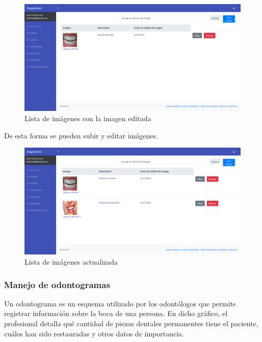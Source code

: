 \begin{figure}[H]
\centering
\includegraphics[width=17cm,keepaspectratio]{pictures/adminodo/pacientes/imagenes/lista-imagenes-llena-3.png}
\caption{Lista de imágenes con la imagen editada}
\end{figure}

De esta forma se pueden subir y editar imágenes.

\begin{figure}[H]
\centering
\includegraphics[width=17cm,keepaspectratio]{pictures/adminodo/pacientes/imagenes/lista-imagenes-llena-4.png}
\caption{Lista de imágenes actualizada}
\end{figure}






\subsubsection{Manejo de odontogramas}

Un odontograma es un esquema utilizado por los odontólogos que permite registrar información sobre la boca de una persona. En dicho gráfico, el profesional detalla qué cantidad de piezas dentales permanentes tiene el paciente, cuáles han sido restauradas y otros datos de importancia.

